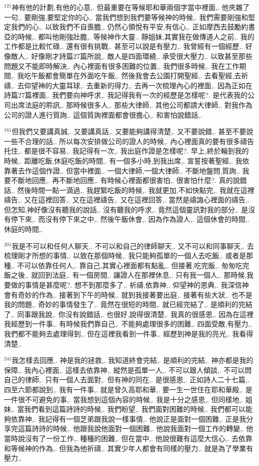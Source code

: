 \documentclass{book}
\begin{document}
$^{121}$神有他的計劃,有他的心意,.
但最重要在等候耶和華兩個字當中裡面,.
他夾雜了一句,.
要剛強,要堅定你的心,.
當我們想到我們要等候神的時候,.
我們需要剛強和堅定我們的心,.
以致我們不自喪膽,.
仍然心領悅有平安,有信心,.
正如摩西去鼓勵約書亞的時候,.
都叫他剛強壯膽,.
等候神作大靈..
靜姐妹,其實我在做傳道人之前,.
我的工作都是比較忙碌,.
還有很有挑戰,.
甚至可以說是有壓力,.
我曾經有一個經歷,.
好像敵人,.
好像剛才詩篇27篇所說,.
敵人是四面環繞,.
承受很大壓力,.
以致甚至那些問題又不能即時解決,.
內心裡面有很多困難的位置,.
我們很多時候,.
我在工作期間,.
我吃午飯都會簡單在外面吃午飯,.
然後我會去公園打開聖經,.
去看聖經,去祈禱,.
去仰望神的大靈耳球,.
去重新的得力,.
去再一次梳理內心的裡面,.
因為正如在詩篇27篇裡面,.
我們要向神呼求,.
我記得我有一次的經歷是怎樣呢?.
是代表我的公司出席法庭的聆訊,.
那時候很多人,.
那些大律師,.
其他公司都請大律師,.
對我作為公司的證人進行質詢,.
這個質詢裡面都會很擔心,.
和害怕說錯話,.

$^{161}$但我們又要講真誠,.
又要講真話,.
又要能夠講得清楚,.
又不要說錯,.
甚至不要說一些不合理的話,.
所以每次安排做公司的證人的時候,.
內心裡面真的要有很多禱告托住,.
都是很不容易,.
我記得有一次,.
我出庭作證是怎樣呢?.
早上,終於輪到我的時候,.
距離吃飯,休庭吃飯的時間,.
有一個多小時,到我出席,.
宣誓按著聖經,.
我依靠著去作這個作證,.
但當中裡面,.
一個大律師,一個大律師,.
不斷地盤問,質詢,.
我要不斷地回應,.
再不斷地回應,.
有時候心裡面都很害怕,.
很害怕什麼?.
真的說錯話,.
然後時間一點一滴過,.
我趕緊吃飯的時候,.
我就更加,不如快點完,.
我就在這裡禱告,.
又在這裡回答,.
又在這裡禱告,.
又在這裡回答,.
當然是禱誨心裡面的禱告,.
但怎知,神好像沒有聽我的說話,.
沒有聽我的呼求,.
竟然這個靈訊對我的部分,.
是沒有停下來,.
而沒有停下來之中,.
然後午飯休會,.
因為作為證人,.
這個休會的時間,.
休庭的時間,.

$^{201}$我是不可以和任何人聊天,.
不可以和自己的律師聊天,.
又不可以和同事聊天,.
去梳理剛才所想的事情,.
以致在那個時候,.
我只能夠孤單的一個人去吃飯,.
或者是那種,.
不可以依靠任何人,.
靠自己,其實心裡面都有點亂,.
但接著,吃完飯,.
匆匆吃完飯之後,.
就回到法庭,.
有一個房間,.
讓證人在那裡休息,.
只有我一個人,.
那時候,我要做的事情是甚麼呢?.
想不到那麼多了,.
祈禱,依靠神,.
仰望神的恩典,.
我深信神會有奇妙的作為,.
接著到下午的時候,.
就到我接著要出庭,.
接著有些大狀,.
也不是我的問題,.
奇妙的事情發生了,.
竟然在很短的時間,.
就已經完結了,.
是順利的完結了,.
同事跟我說,.
你沒有說錯話,.
也很好,說得很清楚,.
我真的很感恩,.
因為在這裡我經歷到一件事,.
有時候我們靠自己,.
不能夠處理很多的困難,.
四面受敵,有壓力,.
我們都不能夠去處理得到,.
但在這裡我看到一件事,.
經歷到神是我的亮光,.
我看得清楚,.

$^{241}$我怎樣去回應,.
神是我的拯救,.
我知道終會完結,.
是順利的完結,.
神亦都是我的保障,.
我內心裡面,.
這樣去依靠神,.
縱然是孤單一人,.
不可以跟人傾談,.
不可以問自己的律師,.
只有一個人去面對,.
但有神的同在,.
是很感恩,.
正如詩人二十七篇,.
四至六節都說到,.
我有一件事,.
就是曾久高耶和華,.
要一生一世住在耶和華殿,.
是一件很不可避免的事,.
當我想到這個內容的時候,.
我是十分之感恩,.
但同樣地,.
姐妹,.
當我們看到這篇詩詩的時候,.
我們盼望,.
我們面對困難的時候,.
我們都可以能夠依靠神,.
我記得有一個芝弟跟我說一樣事情,.
他說正是面對一個困難,.
正是我分享完這篇詩詩的時候,.
他跟我說他面對一個困難,.
他說我面對一個工作的轉變,.
他當時說沒有了一份工作,.
種種的困難,.
但在當中,.
他說很難有這麼大信心,.
去依靠和等候神的作為,.
但我為他祈禱,.
其實少年人都會有同樣的壓力,.
就是為了學業有壓力,.
\end{document}
